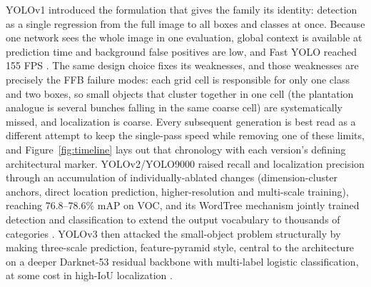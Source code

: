 YOLOv1 introduced the formulation that gives the family its identity: detection as a single regression from the full image to all boxes and classes at once. Because one network sees the whole image in one evaluation, global context is available at prediction time and background false positives are low, and Fast YOLO reached 155 FPS \cite{redmon2016yolo}. The same design choice fixes its weaknesses, and those weaknesses are precisely the FFB failure modes: each grid cell is responsible for only one class and two boxes, so small objects that cluster together in one cell (the plantation analogue is several bunches falling in the same coarse cell) are systematically missed, and localization is coarse. Every subsequent generation is best read as a different attempt to keep the single-pass speed while removing one of these limits, and Figure~\ref{fig:timeline} lays out that chronology with each version's defining architectural marker. YOLOv2/YOLO9000 raised recall and localization precision through an accumulation of individually-ablated changes (dimension-cluster anchors, direct location prediction, higher-resolution and multi-scale training), reaching 76.8--78.6\% mAP on VOC, and its WordTree mechanism jointly trained detection and classification to extend the output vocabulary to thousands of categories \cite{redmon2017yolo9000}. YOLOv3 then attacked the small-object problem structurally by making three-scale prediction, feature-pyramid style, central to the architecture on a deeper Darknet-53 residual backbone with multi-label logistic classification, at some cost in high-IoU localization \cite{redmon2018yolov3}.

